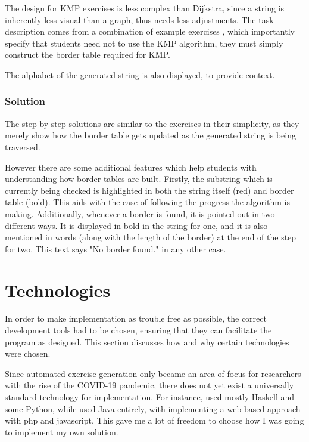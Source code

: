 \documentclass{l4proj}
\begin{document}
The design for KMP exercises is less complex than Dijkstra, since a string is inherently less visual than a graph, thus needs less adjustments. The task description comes from a combination of example exercises \cite{a}, which importantly specify that students need not to use the KMP algorithm, they must simply construct the border table required for KMP. 

The alphabet of the generated string is also displayed, to provide context.

\subsubsection{Solution}
\label{sec:KMPSolutionDesign}

The step-by-step solutions are similar to the exercises in their simplicity, as they merely show how the border table gets updated as the generated string is being traversed.

However there are some additional features which help students with understanding how border tables are built. Firstly, the substring which is currently being checked is highlighted in both the string itself (red) and border table (bold). This aids with the ease of following the progress the algorithm is making. Additionally, whenever a border is found, it is pointed out in two different ways. It is displayed in bold in the string for one, and it is also mentioned in words (along with the length of the border) at the end of the step for two. This text says "No border found." in any other case.

\section{Technologies}

In order to make implementation as trouble free as possible, the correct development tools had to be chosen, ensuring that they can facilitate the program as designed. This section discusses how and why certain technologies were chosen.

Since automated exercise generation only became an area of focus for researchers with the rise of the COVID-19 pandemic, there does not yet exist a universally standard technology for implementation. For instance, \citet{Hoz21} used mostly Haskell and some Python, while \citet {Esh22} used Java entirely, with \citet{Kot19} implementing a web based approach with php and javascript. This gave me a lot of freedom to choose how I was going to implement my own solution. 
\end{document}
